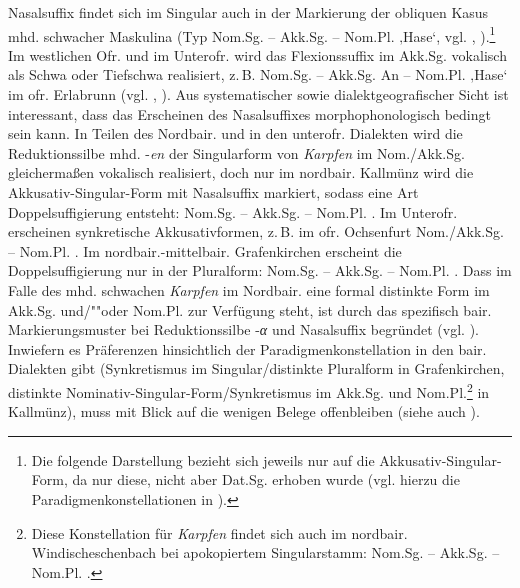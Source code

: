 Nasalsuffix findet sich im Singular auch in der Markierung der obliquen Kasus mhd. schwacher Maskulina (Typ Nom.Sg.  -- Akk.Sg.  -- Nom.Pl.  ‚Hase‘, vgl. \citealt[117]{SMF7}, \citealt[37]{Steinbruckner1976}).\footnote{Die folgende Darstellung bezieht sich jeweils nur auf die Akkusativ-Singular-Form, da nur diese, nicht aber Dat.Sg. erhoben wurde (vgl. hierzu die Paradigmenkonstellationen in ).} Im westlichen Ofr. und im Unterofr. wird das Flexionssuffix im Akk.Sg. vokalisch als Schwa oder Tiefschwa realisiert, z.\,B. Nom.Sg. -- Akk.Sg. An  -- Nom.Pl.  ‚Hase‘ im ofr. Erlabrunn (vgl. , \citealt[Karte 42]{SUF3}). Aus systematischer sowie dialektgeografischer Sicht ist interessant, dass das Erscheinen des Nasalsuffixes morphophonologisch bedingt sein kann. In Teilen des Nordbair. und in den un\-ter\-ofr. Dialekten wird die Reduktionssilbe mhd. -\textit{en} der Singularform von \textit{Karpfen} im Nom./Akk.Sg. gleichermaßen vokalisch realisiert, doch nur im nordbair. Kallmünz wird die Akkusativ-Singular-Form mit Nasalsuffix markiert, sodass eine Art Doppelsuffigierung entsteht: Nom.Sg.  -- Akk.Sg.   -- Nom.Pl. . Im Unterofr. erscheinen synkretische Akkusativformen, z.\,B. im ofr. Ochsenfurt Nom./Akk.Sg.  -- Nom.Pl. . Im nordbair.-mittelbair. Grafenkirchen erscheint die Doppelsuffigierung nur in der Pluralform: Nom.Sg.  -- Akk.Sg. \mbox{} -- Nom.Pl. . Dass im Falle des mhd. schwachen \textit{Karpfen} im Nordbair. eine formal distinkte Form im Akk.Sg. und/""oder Nom.Pl. zur Verfügung steht, ist durch das spezifisch bair. Markierungsmuster bei Reduktionssilbe -\textit{α} und Nasalsuffix begründet (vgl. ). Inwiefern es Präferenzen hinsichtlich der Paradigmenkonstellation in den bair. Dialekten gibt (Synkretismus im Singular/distinkte Pluralform in Grafenkirchen, distinkte No\-mi\-na\-tiv-Sin\-gu\-lar-Form\slash Synkretismus im Akk.Sg. und Nom.Pl.\footnote{Diese Konstellation für \textit{Karpfen} findet sich auch im nordbair. Windischeschenbach bei apokopiertem Singularstamm: Nom.Sg.  -- Akk.Sg.  -- Nom.Pl. .} in Kallmünz), muss mit Blick auf die wenigen Belege offenbleiben (siehe auch ).

